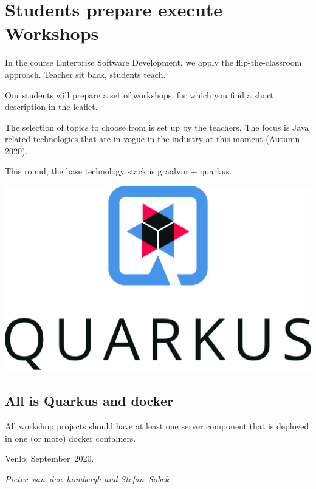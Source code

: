 \section*{Students prepare execute Workshops}
In the course Enterprise Software Development, we apply the
flip-the-classroom approach. Teacher sit back, students teach. 

Our students will prepare a set of workshops, for which you find a short
description in the leaflet.

The selection of topics to choose from is set up by the teachers. The
focus is Java related technologies that are in vogue in the industry
at this moment (Autumn 2020).

This round, the base technology stack is graalvm + quarkus.

\hfill\includegraphics[width=.4\linewidth]{images/quarkus.pdf}

\subsection*{All is Quarkus and docker}
All workshop projects should have at least one server component that is deployed in one (or more) docker containers. 

Venlo, September~2020.

\hfill\textit{Pieter~van~den~hombergh and Stefan~Sobek} 
